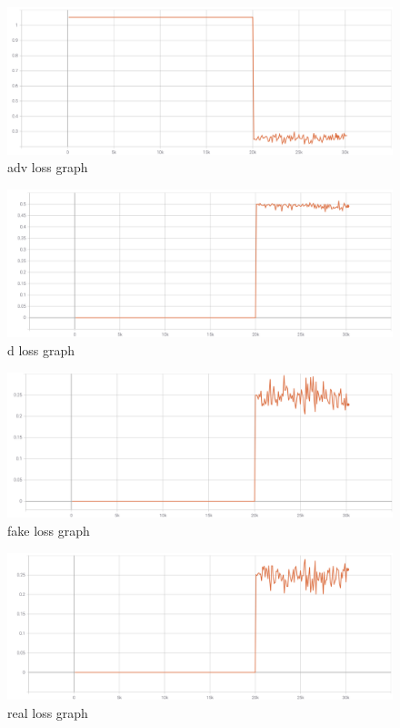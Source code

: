\documentclass[10pt,journal,compsoc]{IEEEtran}
\begin{document}
\begin{figure}
    \centering
    \includegraphics[scale=0.6] {PNG/4-1.png}
    \caption{adv loss graph}
    \label{fig:4-1}
\end{figure}

\begin{figure}
    \centering
    \includegraphics[scale=0.6] {PNG/4-2.png}
    \caption{d loss graph}
    \label{fig:4-2}
\end{figure}

\begin{figure}
    \centering
    \includegraphics[scale=0.6] {PNG/4-3.png}
    \caption{fake loss graph}
    \label{fig:4-3}
\end{figure}

\begin{figure}
    \centering
    \includegraphics[scale=0.6] {PNG/4-4.png}
    \caption{real loss graph}
    \label{fig:4-4}
\end{figure}
\end{document}
